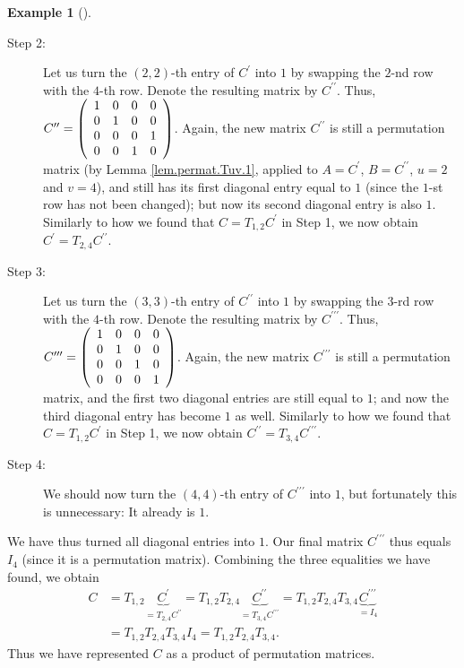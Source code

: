 \documentclass[numbers=enddot,12pt,final,onecolumn,notitlepage]{scrartcl}%
\theoremstyle{definition}
\newtheorem{exam}[theo]{Example}
\newenvironment{example}[1][]
{\begin{exam}[#1]\begin{leftbar}}
{\end{leftbar}\end{exam}}
\begin{document}
\begin{example}
\begin{description}
\item[Step 2:] Let us turn the $\left(  2,2\right)  $-th entry of $C^{\prime}$
into $1$ by swapping the $2$-nd row with the $4$-th row. Denote the resulting
matrix by $C^{\prime\prime}$. Thus, $C^{\prime\prime}=\left(
\begin{array}
[c]{cccc}%
1 & 0 & 0 & 0\\
0 & 1 & 0 & 0\\
0 & 0 & 0 & 1\\
0 & 0 & 1 & 0
\end{array}
\right)  $. Again, the new matrix $C^{\prime\prime}$ is still a permutation
matrix (by Lemma \ref{lem.permat.Tuv.1}, applied to $A=C^{\prime}$,
$B=C^{\prime\prime}$, $u=2$ and $v=4$), and still has its first diagonal entry
equal to $1$ (since the $1$-st row has not been changed); but now its second
diagonal entry is also $1$. Similarly to how we found that $C=T_{1,2}%
C^{\prime}$ in Step 1, we now obtain $C^{\prime}=T_{2,4}C^{\prime\prime}$.

\item[Step 3:] Let us turn the $\left(  3,3\right)  $-th entry of
$C^{\prime\prime}$ into $1$ by swapping the $3$-rd row with the $4$-th row.
Denote the resulting matrix by $C^{\prime\prime\prime}$. Thus, $C^{\prime
\prime\prime}=\left(
\begin{array}
[c]{cccc}%
1 & 0 & 0 & 0\\
0 & 1 & 0 & 0\\
0 & 0 & 1 & 0\\
0 & 0 & 0 & 1
\end{array}
\right)  $. Again, the new matrix $C^{\prime\prime\prime}$ is still a
permutation matrix, and the first two diagonal entries are still equal to $1$;
and now the third diagonal entry has become $1$ as well. Similarly to how we
found that $C=T_{1,2}C^{\prime}$ in Step 1, we now obtain $C^{\prime\prime
}=T_{3,4}C^{\prime\prime\prime}$.

\item[Step 4:] We should now turn the $\left(  4,4\right)  $-th entry of
$C^{\prime\prime\prime}$ into $1$, but fortunately this is unnecessary: It
already is $1$.
\end{description}

We have thus turned all diagonal entries into $1$. Our final matrix
$C^{\prime\prime\prime}$ thus equals $I_{4}$ (since it is a permutation
matrix). Combining the three equalities we have found, we obtain%
\begin{align*}
C  &  =T_{1,2}\underbrace{C^{\prime}}_{=T_{2,4}C^{\prime\prime}}%
=T_{1,2}T_{2,4}\underbrace{C^{\prime\prime}}_{=T_{3,4}C^{\prime\prime\prime}%
}=T_{1,2}T_{2,4}T_{3,4}\underbrace{C^{\prime\prime\prime}}_{=I_{4}}\\
&  =T_{1,2}T_{2,4}T_{3,4}I_{4}=T_{1,2}T_{2,4}T_{3,4}.
\end{align*}
Thus we have represented $C$ as a product of permutation matrices.
\end{example}
\end{document}
